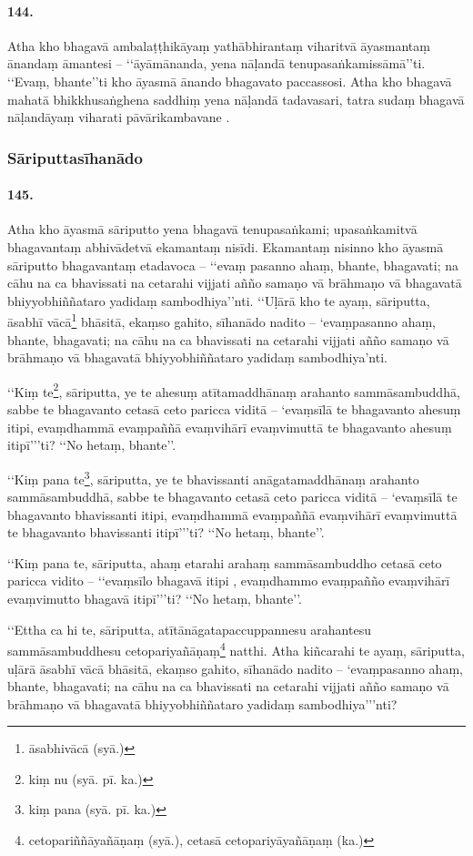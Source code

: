 \paragraph{144.} Atha kho bhagavā ambalaṭṭhikāyaṃ yathābhirantaṃ viharitvā āyasmantaṃ ānandaṃ āmantesi – ‘‘āyāmānanda, yena nāḷandā tenupasaṅkamissāmā’’ti. ‘‘Evaṃ, bhante’’ti kho āyasmā ānando bhagavato paccassosi. Atha kho bhagavā mahatā bhikkhusaṅghena saddhiṃ yena nāḷandā tadavasari, tatra sudaṃ bhagavā nāḷandāyaṃ viharati pāvārikambavane .

\subsubsection{Sāriputtasīhanādo}

\paragraph{145.} Atha kho āyasmā sāriputto yena bhagavā tenupasaṅkami; upasaṅkamitvā bhagavantaṃ abhivādetvā ekamantaṃ nisīdi. Ekamantaṃ nisinno kho āyasmā sāriputto bhagavantaṃ etadavoca – ‘‘evaṃ pasanno ahaṃ, bhante, bhagavati; na cāhu na ca bhavissati na cetarahi vijjati añño samaṇo vā brāhmaṇo vā bhagavatā bhiyyobhiññataro yadidaṃ sambodhiya’’nti. ‘‘Uḷārā kho te ayaṃ, sāriputta, āsabhī vācā\footnote{āsabhivācā (syā.)} bhāsitā, ekaṃso gahito, sīhanādo nadito – ‘evaṃpasanno ahaṃ, bhante, bhagavati; na cāhu na ca bhavissati na cetarahi vijjati añño samaṇo vā brāhmaṇo vā bhagavatā bhiyyobhiññataro yadidaṃ sambodhiya’nti.

‘‘Kiṃ te\footnote{kiṃ nu (syā. pī. ka.)}, sāriputta, ye te ahesuṃ atītamaddhānaṃ arahanto sammāsambuddhā, sabbe te bhagavanto cetasā ceto paricca viditā – ‘evaṃsīlā te bhagavanto ahesuṃ itipi, evaṃdhammā evaṃpaññā evaṃvihārī evaṃvimuttā te bhagavanto ahesuṃ itipī’’’ti? ‘‘No hetaṃ, bhante’’.

‘‘Kiṃ pana te\footnote{kiṃ pana (syā. pī. ka.)}, sāriputta, ye te bhavissanti anāgatamaddhānaṃ arahanto sammāsambuddhā, sabbe te bhagavanto cetasā ceto paricca viditā – ‘evaṃsīlā te bhagavanto bhavissanti itipi, evaṃdhammā evaṃpaññā evaṃvihārī evaṃvimuttā te bhagavanto bhavissanti itipī’’’ti? ‘‘No hetaṃ, bhante’’.

‘‘Kiṃ pana te, sāriputta, ahaṃ etarahi arahaṃ sammāsambuddho cetasā ceto paricca vidito – ‘‘evaṃsīlo bhagavā itipi , evaṃdhammo evaṃpañño evaṃvihārī evaṃvimutto bhagavā itipī’’’ti? ‘‘No hetaṃ, bhante’’.

‘‘Ettha ca hi te, sāriputta, atītānāgatapaccuppannesu arahantesu sammāsambuddhesu cetopariyañāṇaṃ\footnote{cetopariññāyañāṇaṃ (syā.), cetasā cetopariyāyañāṇaṃ (ka.)} natthi. Atha kiñcarahi te ayaṃ, sāriputta, uḷārā āsabhī vācā bhāsitā, ekaṃso gahito, sīhanādo nadito – ‘evaṃpasanno ahaṃ, bhante, bhagavati; na cāhu na ca bhavissati na cetarahi vijjati añño samaṇo vā brāhmaṇo vā bhagavatā bhiyyobhiññataro yadidaṃ sambodhiya’’’nti?

